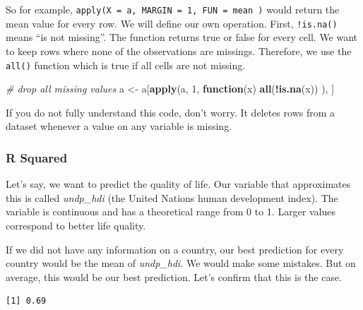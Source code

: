 \documentclass[]{article}
\newenvironment{Shaded}{\begin{snugshade}}{\end{snugshade}}
\newcommand{\KeywordTok}[1]{\textcolor[rgb]{0.13,0.29,0.53}{\textbf{#1}}}
\newcommand{\DataTypeTok}[1]{\textcolor[rgb]{0.13,0.29,0.53}{#1}}
\newcommand{\DecValTok}[1]{\textcolor[rgb]{0.00,0.00,0.81}{#1}}
\newcommand{\StringTok}[1]{\textcolor[rgb]{0.31,0.60,0.02}{#1}}
\newcommand{\CommentTok}[1]{\textcolor[rgb]{0.56,0.35,0.01}{\textit{#1}}}
\newcommand{\ControlFlowTok}[1]{\textcolor[rgb]{0.13,0.29,0.53}{\textbf{#1}}}
\newcommand{\OperatorTok}[1]{\textcolor[rgb]{0.81,0.36,0.00}{\textbf{#1}}}
\newcommand{\NormalTok}[1]{#1}
\theoremstyle{definition}
\theoremstyle{definition}
\theoremstyle{definition}
\theoremstyle{remark}
\begin{document}
So for example, \texttt{apply(X\ =\ a,\ MARGIN\ =\ 1,\ FUN\ =\ mean\ )}
would return the mean value for every row. We will define our own
operation. First, \texttt{!is.na()} means ``is not missing''. The
function returns true or false for every cell. We want to keep rows
where none of the observations are missings. Therefore, we use the
\texttt{all()} function which is true if all cells are not missing.

\begin{Shaded}
\begin{Highlighting}[]
\CommentTok{# drop all missing values}
\NormalTok{a <-}\StringTok{ }\NormalTok{a[}\KeywordTok{apply}\NormalTok{(a, }\DecValTok{1}\NormalTok{, }\ControlFlowTok{function}\NormalTok{(x) }\KeywordTok{all}\NormalTok{(}\OperatorTok{!}\KeywordTok{is.na}\NormalTok{(x)) ), ]}
\end{Highlighting}
\end{Shaded}

If you do not fully understand this code, don't worry. It deletes rows
from a dataset whenever a value on any variable is missing.

\subsubsection{R Squared}\label{r-squared}

Let's say, we want to predict the quality of life. Our variable that
approximates this is called \emph{undp\_hdi} (the United Nations human
development index). The variable is continuous and has a theoretical
range from 0 to 1. Larger values correspond to better life quality.

If we did not have any information on a country, our best prediction for
every country would be the mean of \emph{undp\_hdi}. We would make some
mistakes. But on average, this would be our best prediction. Let's
confirm that this is the case.

\begin{Shaded}
\end{Shaded}

\begin{verbatim}
[1] 0.69
\end{verbatim}
\end{document}
